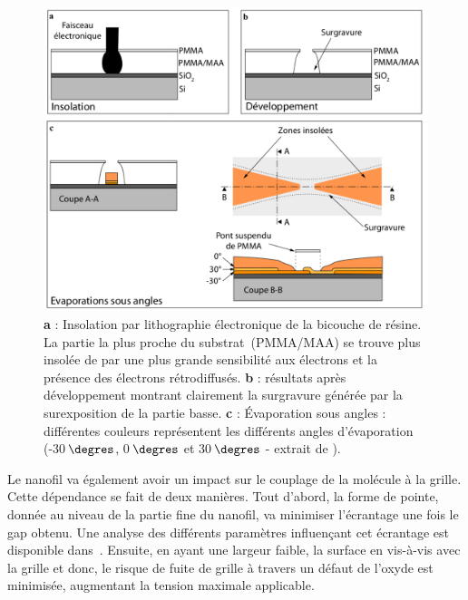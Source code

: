 \begin{figure}[h!]
\centering \includegraphics[scale=0.45]{Fabrication/EvapAngle/EvapAngle.pdf}
\caption{\textbf{a} : Insolation par lithographie électronique de la bicouche de résine. La partie la plus proche du substrat~(PMMA/MAA) se trouve plus insolée de par une plus grande sensibilité aux électrons et la présence des électrons rétrodiffusés. \textbf{b} : résultats après développement montrant clairement la surgravure générée par la surexposition de la partie basse. \textbf{c} : Évaporation sous angles : différentes couleurs représentent les différents angles d'évaporation (-30$\,\degres$, 0$\,\degres$ et 30$\,\degres$ - extrait de \cite{RochPhd}).}
\label{EvapAngle}
\end{figure}

Le nanofil va également avoir un impact sur le couplage de la molécule à la grille. Cette dépendance se fait de deux manières. Tout d'abord, la forme de pointe, donnée au niveau de la partie fine du nanofil, va minimiser l'écrantage une fois le gap obtenu. Une analyse des différents paramètres influençant cet écrantage est disponible dans~\cite{Datta2009}. Ensuite, en ayant une largeur faible, la surface en vis-à-vis avec la grille et donc, le risque de fuite de grille à travers un défaut de l'oxyde est minimisée, augmentant la tension maximale applicable.

